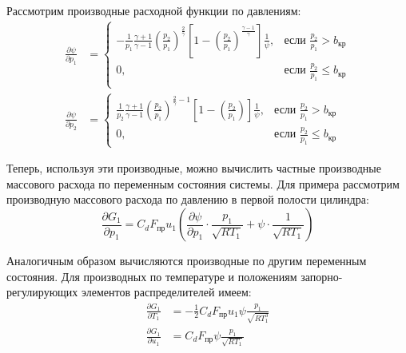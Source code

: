 Рассмотрим производные расходной функции по давлениям:
\begin{equation}\label{eq:ch2/flow_function_derivatives}
    \begin{alignedat}{6}
        \frac{\partial \psi}{\partial p_1} & = \begin{cases}
                                                   -\frac{1}{p_1}\frac{\gamma+1}{\gamma-1}\left(\frac{p_2}{p_1}\right)^{\frac{2}{\gamma}}\left[1 - \left(\frac{p_2}{p_1}\right)^{\frac{\gamma-1}{\gamma}}\right]\frac{1}{\psi}, & \text{если } \frac{p_2}{p_1} > b_\text{кр}    \\
                                                   0,                                                                                                                                                                           & \text{если } \frac{p_2}{p_1} \leq b_\text{кр} \\
                                               \end{cases} \\
        \frac{\partial \psi}{\partial p_2} & = \begin{cases}
                                                   \frac{1}{p_2}\frac{\gamma+1}{\gamma-1}\left(\frac{p_2}{p_1}\right)^{\frac{2}{\gamma}-1}\left[1 - \left(\frac{p_2}{p_1}\right)\right]\frac{1}{\psi}, & \text{если } \frac{p_2}{p_1} > b_\text{кр}    \\
                                                   0,                                                                                                                                                  & \text{если } \frac{p_2}{p_1} \leq b_\text{кр}
                                               \end{cases}
    \end{alignedat}
\end{equation}

Теперь, используя эти производные, можно вычислить частные производные массового расхода по переменным состояния системы. Для примера рассмотрим производную массового расхода по давлению в первой полости цилиндра:
\begin{equation}\label{eq:ch2/mass_flow_derivative}
    \frac{\partial G_1}{\partial p_1} = C_d F_\text{пр} u_1 \left(\frac{\partial \psi}{\partial p_1} \cdot \frac{p_1}{\sqrt{RT_1}} + \psi \cdot \frac{1}{\sqrt{RT_1}}\right)
\end{equation}

Аналогичным образом вычисляются производные по другим переменным состояния. Для производных по температуре и положениям запорно-регулирующих элементов распределителей имеем:
\begin{equation}\label{eq:ch2/mass_flow_derivative_T}
    \begin{aligned}
        \frac{\partial G_1}{\partial T_1} & = -\frac{1}{2} C_d F_\text{пр} u_1 \psi \frac{p_1}{\sqrt{RT_1^3}} \\
        \frac{\partial G_1}{\partial u_1} & = C_d F_\text{пр} \psi \frac{p_1}{\sqrt{RT_1}}
    \end{aligned}
\end{equation}

